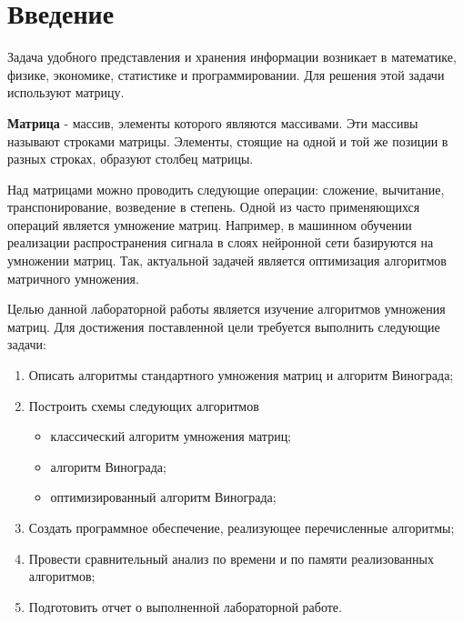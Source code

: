 \chapter*{Введение}

Задача удобного представления и хранения информации возникает в математике, физике, экономике, статистике и программировании. Для решения этой задачи используют матрицу.

\textbf{Матрица} \cite{virt} - массив, элементы которого являются массивами. Эти массивы называют строками матрицы. Элементы, стоящие на одной и той же позиции в разных строках, образуют столбец матрицы.

Над матрицами можно проводить следующие операции: сложение, вычитание, транспонирование, возведение в степень. Одной из часто применяющихся операций является умножение матриц. Например, в машинном обучении реализации распространения сигнала в слоях нейронной сети базируются на умножении матриц. Так, актуальной задачей является оптимизация алгоритмов матричного умножения.

Целью данной лабораторной работы является изучение алгоритмов умножения матриц. Для достижения поставленной цели требуется выполнить следующие задачи:

\begin{enumerate}
	\item Описать алгоритмы стандартного умножения матриц и алгоритм Винограда;
	\item Построить схемы следующих алгоритмов
		\begin{itemize}[label=---]
			\item классический алгоритм умножения матриц;
			\item алгоритм Винограда;
			\item оптимизированный алгоритм Винограда;
		\end{itemize}
	\item Создать программное обеспечение, реализующее перечисленные алгоритмы;
	\item Провести сравнительный анализ по времени и по памяти реализованных алгоритмов;
	\item Подготовить отчет о выполненной лабораторной работе.
\end{enumerate}
